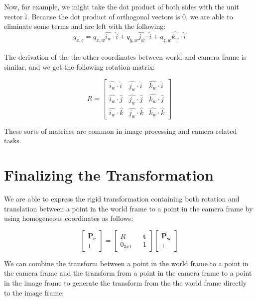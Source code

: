 \documentclass[]{article}
\begin{document}
	Now, for example, we might take the dot product of both sides with the unit vector $\hat{i}$. Because the dot product of orthogonal vectors is 0, we are able to eliminate some terms and are left with the following:
	\begin{equation}
	q_{x,c} = q_{x,w}\hat{i_w} \cdot \hat{i} + q_{y,w}\hat{j_w} \cdot \hat{i} + q_{z,w}\hat{k_w} \cdot \hat{i}
	\end{equation}\\
	The derivation of the the other coordinates between world and camera frame is similar, and we get the following rotation matrix:
	
	\begin{equation}
	R =
	\begin{bmatrix}
	\hat{i_w} \cdot \hat{i} & \hat{j_w} \cdot \hat{i} & \hat{k_w} \cdot \hat{i} \\
	\hat{i_w} \cdot \hat{j} & \hat{j_w} \cdot \hat{j} & \hat{k_w} \cdot \hat{j} \\
	\hat{i_w} \cdot \hat{k} & \hat{j_w} \cdot \hat{k} & \hat{k_w} \cdot \hat{k}
	\end{bmatrix}
	\end{equation}
	
	These sorts of matrices are common in image processing and camera-related tasks.
	
	\section{Finalizing the Transformation}
	We are able to express the rigid transformation containing both rotation and translation between a point in the world frame to a point in the camera frame by using homogeneous coordinates as follows:
	
	\begin{equation}
	\begin{bmatrix}
	\boldsymbol{P_c} \\
	1
	\end{bmatrix}
	=
	\begin{bmatrix}
	R && \boldsymbol{t} \\
	0_{3x1} && 1
	\end{bmatrix}
	\begin{bmatrix}
	\boldsymbol{P_w} \\ 1
	\end{bmatrix}
	\end{equation}
	
	We can combine the transform between a point in the world frame to a point in the camera frame and the transform from a point in the camera frame to a point in the image frame to generate the transform from the the world frame directly to the image frame:
	
\end{document}
